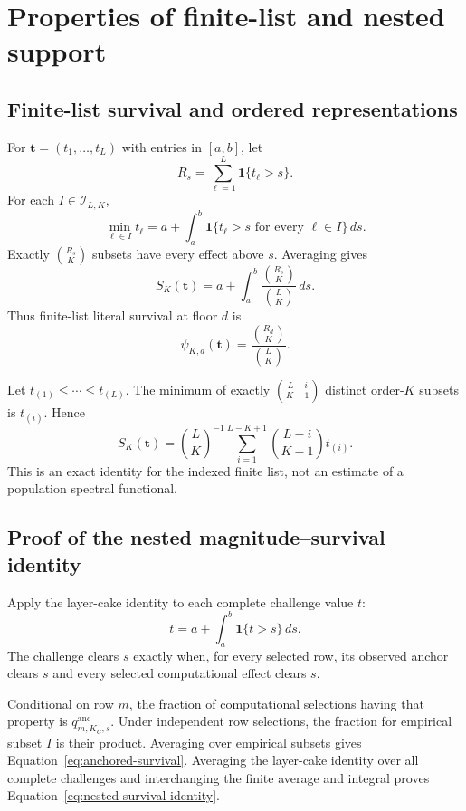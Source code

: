 \documentclass[11pt]{article}
\theoremstyle{remark}
\begin{document}
\section{Properties of finite-list and nested support}
\label{app:support-proofs}

\subsection{Finite-list survival and ordered representations}

For $\mathbf t=(t_1,\ldots,t_L)$ with entries in $[a,b]$, let
\[
R_s=\sum_{\ell=1}^L\mathbf 1\{t_\ell>s\}.
\]
For each $I\in\mathcal I_{L,K}$,
\[
\min_{\ell\in I}t_\ell
=
a+\int_a^b
\mathbf 1\{t_\ell>s\text{ for every }\ell\in I\}\,ds.
\]
Exactly $\binom{R_s}{K}$ subsets have every effect above $s$. Averaging gives
\begin{equation}
S_K(\mathbf t)
=
a+\int_a^b
\frac{\binom{R_s}{K}}{\binom{L}{K}}\,ds.
\label{eq:finite-survival}
\end{equation}
Thus finite-list literal survival at floor $d$ is
\begin{equation}
\psi_{K,d}(\mathbf t)
=
\frac{\binom{R_d}{K}}{\binom{L}{K}}.
\label{eq:finite-literal}
\end{equation}

Let $t_{(1)}\leq\cdots\leq t_{(L)}$. The minimum of exactly
$\binom{L-i}{K-1}$ distinct order-$K$ subsets is $t_{(i)}$. Hence
\begin{equation}
S_K(\mathbf t)
=
\binom{L}{K}^{-1}
\sum_{i=1}^{L-K+1}
\binom{L-i}{K-1}t_{(i)}.
\label{eq:finite-ordered}
\end{equation}
This is an exact identity for the indexed finite list, not an estimate of a
population spectral functional.

\subsection{Proof of the nested magnitude--survival identity}
\label{app:proof-survival-identity}

Apply the layer-cake identity to each complete challenge value $t$:
\[
t
=
a+\int_a^b\mathbf 1\{t>s\}\,ds.
\]
The challenge clears $s$ exactly when, for every selected row, its observed
anchor clears $s$ and every selected computational effect clears $s$.

Conditional on row $m$, the fraction of computational selections having that
property is $q^{\mathrm{anc}}_{m,K_C,s}$. Under independent row selections, the
fraction for empirical subset $I$ is their product. Averaging over empirical
subsets gives Equation~\eqref{eq:anchored-survival}. Averaging the layer-cake
identity over all complete challenges and interchanging the finite average and
integral proves Equation~\eqref{eq:nested-survival-identity}.
\end{document}
